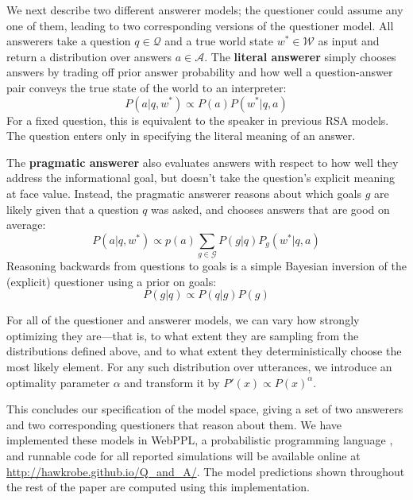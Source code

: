 \documentclass[10pt,letterpaper]{article}
\begin{document}
We next describe two different answerer models; the questioner could assume any one of them, leading to two corresponding versions of the questioner model.
All answerers take a question $q \in \mathcal{Q}$ and a true world state $w^* \in \mathcal{W}$ as input and return a distribution over answers $a \in \mathcal{A}$.
%
The \textbf{literal answerer} simply chooses answers by trading off prior answer probability  and how well a question-answer pair conveys the true state of the world to an interpreter:
%
$$P(a | q,w^*) \propto P(a) P(w^* | q, a) $$
%
For a fixed question, this is equivalent to the speaker in previous RSA models. The question enters only in specifying the literal meaning of an answer.
%

The \textbf{pragmatic answerer} also evaluates answers with respect to how well they address the informational goal, but doesn't take the question's explicit meaning at face value. Instead, the pragmatic answerer reasons about which goals $g$ are likely given that a question $q$ was asked, and chooses answers that are good on average:
%
$$
P(a | q, w^*) \propto p(a) \sum_{g \in \mathcal{G}} P(g|q) P_g(w^*|q, a)
$$
Reasoning backwards from questions to goals is a simple Bayesian inversion of the (explicit) questioner using a prior on goals:
$$
P(g|q) \propto P(q|g)P(g)
$$

For all of the questioner and answerer models, we can vary how strongly optimizing they are---that is, to what extent they are sampling from the distributions defined above, and to what extent they deterministically choose the most likely element. For any such distribution over utterances, we introduce an optimality parameter $\alpha$ and transform it by $ P'(x) \propto P(x)^{\alpha} $.
%

This concludes our specification of the model space, giving a set of two answerers and two corresponding questioners that reason about them. We have implemented these models in WebPPL, a probabilistic programming language \cite{GoodmanStuhlmuller14_DIPPL}, and runnable code for all reported simulations will be available online at \url{http://hawkrobe.github.io/Q_and_A/}. The model predictions shown throughout the rest of the paper are computed using this implementation.
\end{document}
